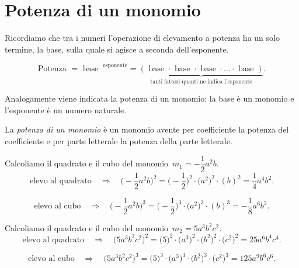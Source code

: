 \ovalbox{\risolvii \ref{ese:9.13}, \ref{ese:9.14}, \ref{ese:9.15}, \ref{ese:9.16}}

\section{Potenza di un monomio}

Ricordiamo che tra i numeri l'operazione di elevamento a
potenza ha un solo termine, la base, sulla quale si agisce a seconda
dell'esponente.

\[\text{Potenza }=\text{ base }^\text{ esponente}= \underbrace{(\text{ base }\cdot \text{ base }\cdot\text{ base }\cdot\ldots\cdot \text{ base })}_{\text{tanti fattori quanti ne indica l'esponente}}.\]

Analogamente viene indicata la potenza di un monomio: la base è un
monomio e l'esponente è un numero naturale.

\begin{definizione}
La \emph{potenza di un monomio} è un monomio
avente per coefficiente la potenza del coefficiente e per parte
letterale la potenza della parte letterale.
\end{definizione}

\begin{exrig}
 \begin{esempio}
Calcoliamo il quadrato e il cubo del monomio~$m_{1}=-{\dfrac{1}{2}}a^{2}b$.
\[\text{elevo al quadrato}\quad\Rightarrow\quad\bigg(-{\frac{1}{2}}a^{2}b\bigg)^{2}
=\bigg(-{\frac{1}{2}}\bigg)^{2}\cdot\big(a^{2}\big)^{2}\cdot (b)^{2}=\frac{1}{4}a^{4}b^{2}.\]

\[\text{elevo al cubo}\quad\Rightarrow\quad\bigg(-{\frac{1}{2}}a^{2}b\bigg)^{3}
=\bigg(-{\frac{1}{2}}\bigg)^{3}\cdot\big(a^{2}\big)^{3}\cdot (b)^{3}
=-{\frac{1}{8}}a^{6}b^{3}.\]
 \end{esempio}

 \begin{esempio}
Calcoliamo il quadrato e il cubo del monomio~$m_{2}=5a^{3}b^{2}c^{2}$.
\[\text{elevo al quadrato}\quad\Rightarrow\quad\big(5a^{3}b^{2}c^{2}\big)^{2}
=\big(5\big)^{2}\cdot \big(a^{3}\big)^{2}\cdot\big(b^{2}\big)^{2}\cdot \big(c^{2}\big)^{2}
=25a^{6}b^{4}c^{4}.\]

\[\text{elevo al cubo}\quad\Rightarrow\quad\big(5a^{3}b^{2}c^{2}\big)^{3}
=\big(5\big)^{3}\cdot \big(a^{3}\big)^{3}\cdot\big(b^{2}\big)^{3}\cdot \big(c^{2}\big)^{3}
=125a^{9}b^{6}c^{6}.\]
 \end{esempio}
\end{exrig}

